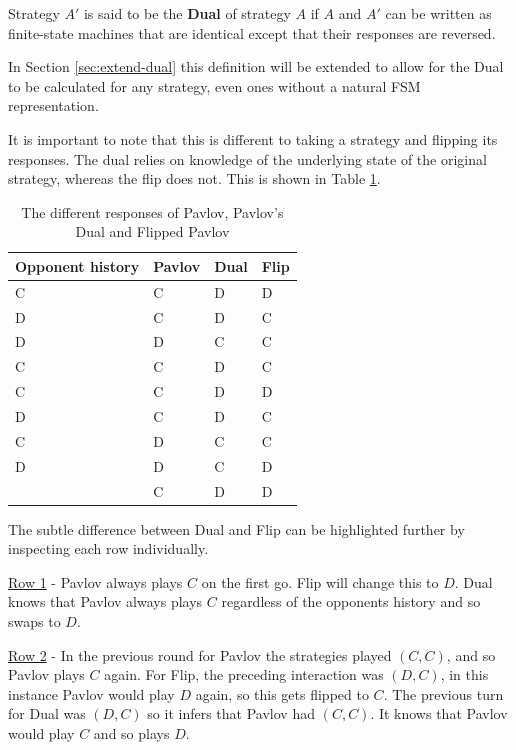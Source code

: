 \begin{definition}\label{def:dual}
Strategy $A'$ is said to be the \textbf{Dual} of strategy $A$ if $A$ and $A'$ can be written as finite-state machines that are identical except that their responses are reversed.
\end{definition}

In Section \ref{sec:extend-dual} this definition will be extended to allow for the Dual to be calculated for any strategy, even ones without a natural FSM representation.

It is important to note that this is different to taking a strategy and flipping its responses.
The dual relies on knowledge of the underlying state of the original strategy, whereas the flip does not.
This is shown in Table \ref{tab:strat-dual-flip}.

\begin{table}[htbp]
    \centering
    \begin{tabular}{l l l l}
        \toprule
        Opponent history & Pavlov & Dual & Flip \\
        \midrule
        C & C & D & D \\
        D & C & D & C \\
        D & D & C & C \\
        C & C & D & C \\
        C & C & D & D \\
        D & C & D & C \\
        C & D & C & C \\
        D & D & C & D \\
          & C & D & D \\
        \bottomrule
    \end{tabular}
    \caption{The different responses of Pavlov, Pavlov's Dual and Flipped Pavlov}
    \label{tab:strat-dual-flip}
\end{table}

The subtle difference between Dual and Flip can be highlighted further by inspecting each row individually.

\underline{Row 1} - Pavlov always plays $C$ on the first go.
Flip will change this to $D$.
Dual knows that Pavlov always plays $C$ regardless of the opponents history and so swaps to $D$.

\underline{Row 2} - In the previous round for Pavlov the strategies played $(C, C)$, and so Pavlov plays $C$ again.
For Flip, the preceding interaction was $(D, C)$, in this instance Pavlov would play $D$ again, so this gets flipped to $C$.
The previous turn for Dual was $(D, C)$ so it infers that Pavlov had $(C, C)$.
It knows that Pavlov would play $C$ and so plays $D$.

